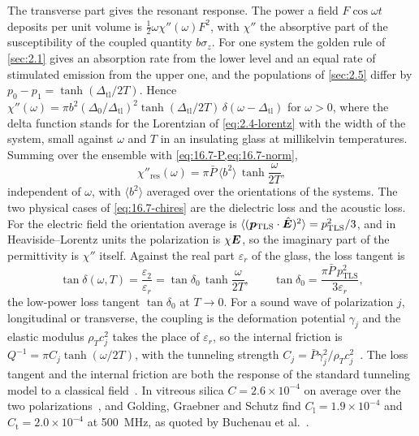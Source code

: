 The transverse part gives the resonant response. The power a field $F\cos\omega t$ deposits per unit volume is $\tfrac12\omega\chi''(\omega)F^2$, with $\chi''$ the absorptive part of the susceptibility of the coupled quantity $b\sigma_z$. For one system the golden rule of \cref{sec:2.1} gives an absorption rate from the lower level and an equal rate of stimulated emission from the upper one, and the populations of \cref{sec:2.5} differ by $p_0 - p_1 = \tanh(\Delta_{\mathrm{tl}}/2T)$. Hence $\chi''(\omega) = \pi b^2(\Delta_0/\Delta_{\mathrm{tl}})^2\tanh(\Delta_{\mathrm{tl}}/2T)\,\delta(\omega - \Delta_{\mathrm{tl}})$ for $\omega > 0$, where the delta function stands for the Lorentzian of \cref{eq:2.4-lorentz} with the width of the system, small against $\omega$ and $T$ in an insulating glass at millikelvin temperatures. Summing over the ensemble with \cref{eq:16.7-P,eq:16.7-norm},
\begin{equation}
  \chi''_{\mathrm{res}}(\omega) = \pi\bar P\,\langle b^2\rangle\,\tanh\frac{\omega}{2T} ,
  \label{eq:16.7-chires}
\end{equation}
independent of $\omega$, with $\langle b^2\rangle$ averaged over the orientations of the systems. The two physical cases of \cref{eq:16.7-chires} are the dielectric loss and the acoustic loss. For the electric field the orientation average is $\langle(\bm{p}_{\mathrm{TLS}}\cdot\hat{\bm{E}})^2\rangle = p_{\mathrm{TLS}}^2/3$, and in Heaviside--Lorentz units the polarization is $\chi\bm{E}$, so the imaginary part of the permittivity is $\chi''$ itself. Against the real part $\varepsilon_r$ of the glass, the loss tangent is
\begin{equation}
  \tan\delta(\omega,T) = \frac{\varepsilon_2}{\varepsilon_r} = \tan\delta_0\,\tanh\frac{\omega}{2T} , \qquad
  \tan\delta_0 = \frac{\pi\bar P\,p_{\mathrm{TLS}}^2}{3\varepsilon_r} ,
  \label{eq:16.7-tand}
\end{equation}
the low-power loss tangent $\tan\delta_0$ at $T \to 0$. For a sound wave of polarization $j$, longitudinal or transverse, the coupling is the deformation potential $\gamma_j$ and the elastic modulus $\rho_Tc_j^2$ takes the place of $\varepsilon_r$, so the internal friction is $Q^{-1} = \pi C_j\tanh(\omega/2T)$, with the tunneling strength $C_j = \bar P\gamma_j^2/\rho_Tc_j^2$~\cite[Eqs.~(5), (6)]{buchenau2020sound}. The loss tangent and the internal friction are both the response of the standard tunneling model to a classical field~\cite[Eqs.~(4), (12), (13), (15)]{meissner2021acoustic}. In vitreous silica $C = 2.6\times10^{-4}$ on average over the two polarizations~\cite[Table~I]{buchenau2020sound}, and Golding, Graebner and Schutz find $C_{\mathrm{l}} = 1.9\times10^{-4}$ and $C_{\mathrm{t}} = 2.0\times10^{-4}$ at \SI{500}{MHz}, as quoted by Buchenau et al.~\cite[Sect.~III]{buchenau2020sound}.

